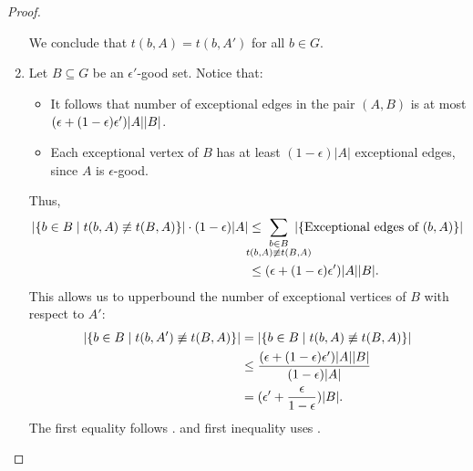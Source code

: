\begin{lemma}
\begin{proof}
\begin{enumerate}[label=(\alph*), ref=\alph*]
                We conclude that $t(b,A) = t(b,A')$ for all $b \in G$.
                \item
                    Let $B \subseteq G$ be an $\epsilon'$-good set.
                    Notice that:
                    \begin{itemize}
                        \item \sloppy It follows  that number of exceptional edges
                            in the pair $(A,B)$ is at most \mbox{$( \epsilon + ( 1 - \epsilon ) \epsilon' )| A || B |$}.
                        \item Each exceptional vertex of $B$ has at least $(1-\epsilon)|A|$ exceptional edges, since
                            $A$ is $\epsilon$-good.
                    \end{itemize}
                    Thus,
                    \begin{align} \nonumber
                        \parstraight{\parcurly{b \in B \mid t(b, A) \not\equiv t(B,A)}} \cdot \parround{1 - \epsilon}\parstraight{A}
                            & \leq \hspace{-1.5em}\sum_{\substack{b \in B \\ t(b, A) \not\equiv t(B,A)}}\hspace{-1.5em}
                                \parstraight{\parcurly{\text{Exceptional edges of }(b,A)}} \\
                            & \leq \parround{\epsilon + \parround{1 - \epsilon} \epsilon'}\parstraight{A}\parstraight{B}. \label{eq:exceptions}
                    \end{align}
                    This allows us to upperbound the number of exceptional vertices of $B$ with respect to $A'$:
                    \begin{align*}
                        | \{ b \in B \mid t(b, A') \not\equiv t(B,A) \} |
                            & = | \{ b \in B \mid t(b, A) \not\equiv t(B,A) \} | \\
                            & \leq \frac{( \epsilon + ( 1 - \epsilon ) \epsilon' )| A || B |}
                                {( 1 - \epsilon )| A |} \\
                            & = ( \epsilon' + \frac{\epsilon}{1 - \epsilon} )| B |.
                    \end{align*}
                    The first equality follows .
                    and first inequality uses .


\end{enumerate}
\end{proof}
\end{lemma}
